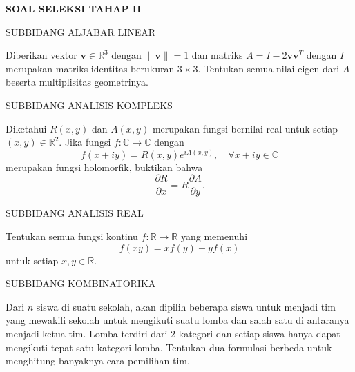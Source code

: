 \documentclass{article}
\begin{document}
\begin{center}
  \textbf{SOAL SELEKSI TAHAP II}
\end{center}

\vspace{0.5cm}

\begin{center}
  SUBBIDANG ALJABAR LINEAR
\end{center}

Diberikan vektor $\mathbf{v} \in \mathbb{R}^3$ dengan $\|\mathbf{v}\| = 1$ dan matriks $A = I - 2\mathbf{v}\mathbf{v}^T$ dengan $I$ merupakan matriks identitas berukuran $3 \times 3$. Tentukan semua nilai eigen dari $A$ beserta multiplisitas geometrinya.

\vspace{0.5cm}

\begin{center}
  SUBBIDANG ANALISIS KOMPLEKS
\end{center}

Diketahui $R(x, y)$ dan $A(x, y)$ merupakan fungsi bernilai real untuk setiap $(x, y) \in \mathbb{R}^2$. Jika fungsi $f : \mathbb{C} \to \mathbb{C}$ dengan
\[
  f(x + iy) = R(x, y)e^{iA(x,y)}, \quad \forall x + iy \in \mathbb{C}
\]
merupakan fungsi holomorfik, buktikan bahwa
\[
  \frac{\partial R}{\partial x} = R\frac{\partial A}{\partial y}.
\]

\vspace{0.5cm}

\begin{center}
  SUBBIDANG ANALISIS REAL
\end{center}

Tentukan semua fungsi kontinu $f : \mathbb{R} \to \mathbb{R}$ yang memenuhi
\[
  f(xy) = xf(y) + yf(x)
\]
untuk setiap $x, y \in \mathbb{R}$.

\vspace{0.5cm}

\begin{center}
  SUBBIDANG KOMBINATORIKA
\end{center}

Dari $n$ siswa di suatu sekolah, akan dipilih beberapa siswa untuk menjadi tim yang mewakili sekolah untuk mengikuti suatu lomba dan salah satu di antaranya menjadi ketua tim. Lomba terdiri dari 2 kategori dan setiap siswa hanya dapat mengikuti tepat satu kategori lomba. Tentukan dua formulasi berbeda untuk menghitung banyaknya cara pemilihan tim.

\vspace{0.5cm}
\end{document}
